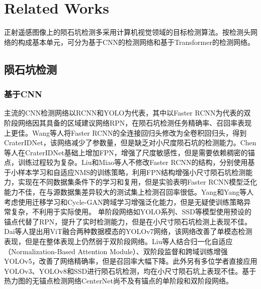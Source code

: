 \section{Related Works}
\label{sec:related_works}
正射遥感图像上的陨石坑检测多采用计算机视觉领域的目标检测算法。按检测头网络的构成基本单元，可分为基于CNN的检测网络和基于Transformer的检测网络。
\subsection{陨石坑检测}
\subsubsection{基于CNN}
主流的CNN检测网络以RCNN和YOLO为代表，其中以Faster RCNN\cite{renFasterRCNNRealtime2015}为代表的双阶段网络因其具备的区域建议网络RPN，在陨石坑检测任务精确率、召回率表现上更佳。Wang\cite{wangCraterIDNetEndendFully2018}等人将Faster RCNN的全连接回归头修改为全卷积回归头，得到CraterIDNet，该网络减少了参数量，但是缺乏对小尺度陨石坑的检测能力。Chen\cite{chenCraterDetectionRecognition2021}等人在CraterIDNet基础上增加FPN，增强了尺度敏感性，但是需要依赖稠密的锚点，训练过程较为复杂。Liu\cite{liuIdentificationLunarCraters2024}和Miao\cite{miaoLCDNetInnovativeNeural2024}等人不修改Faster RCNN的结构，分别使用基于小样本学习和自适应NMS的训练策略，利用FPN结构增强小尺寸陨石坑检测能力，实现在不同数据集条件下的学习和复用，但是实验表明Faster RCNN模型泛化能力不佳，在与源数据集差异较大的测试集上检测召回率很低。Yang\cite{yangLunarImpactCrater2020}和Yang\cite{yangCraterDANetConvolutionalNeural2022}等人考虑使用迁移学习和Cycle-GAN\cite{zhuUnpairedImageimageTranslation2017}跨域学习增强泛化能力，但是无疑使训练策略异常复杂，不利用于实际使用。
单阶段网络如YOLO系列、SSD等模型使用预设的锚点代替了RPN，提升了实时检测能力，但是在小尺寸陨石坑检测上表现不佳。Dai\cite{daiBoostingCraterDetection2023}等人提出用ViT\cite{dosovitskiyImageWorth16x162021}融合两种数据模态的YOLOv7网络，该网络改善了单模态检测表现，但是在整体表现上仍然弱于双阶段网络。Liu\cite{liuTwostageAdaptiveNetwork2024}等人结合归一化自适应（Normalization-Based Attention Module）、双阶段监督和跨域训练增强YOLOv5，改善了网络精确率，但是召回率大幅下降。此外另有多位学者直接应用YOLOv3\cite{fairweatherAutomaticMappingSmall2022}、YOLOv8\cite{wangCatalogueImpactCraters2024}和SSD\cite{silvestriniOpticalNavigationLunar2022}进行陨石坑检测，均在小尺寸陨石坑上表现不佳。基于热力图的无锚点检测网络CenterNet\cite{zhangAutomaticDetectionSmallscale2024,yangTopographicKnowledgeawareNetwork2024}尚不及有锚点的单阶段和双阶段网络。
